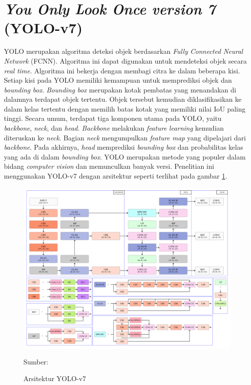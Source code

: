 \section{\textit{You Only Look Once version 7} (YOLO-v7)}
YOLO merupakan algoritma deteksi objek berdasarkan \textit{Fully Connected Neural Network} (FCNN). Algoritma ini dapat digunakan untuk mendeteksi objek secara \textit{real time}. Algoritma ini bekerja dengan membagi citra ke dalam beberapa kisi. Setiap kisi pada YOLO memiliki kemampuan untuk memprediksi objek dan \textit{bounding box}. \textit{Bounding box} merupakan kotak pembatas yang menandakan di dalamnya terdapat objek tertentu. Objek tersebut kemudian diklasifikasikan ke dalam kelas tertentu dengan memilih batas kotak yang memiliki nilai IoU paling tinggi. Secara umum, terdapat tiga komponen utama pada YOLO, yaitu \textit{backbone}, \textit{neck}, dan \textit{head}. \textit{Backbone} melakukan \textit{feature learning} kemudian diteruskan ke \textit{neck}. Bagian \textit{neck} mengumpulkan \textit{feature map} yang dipelajari dari \textit{backbone}. Pada akhirnya, \textit{head} memprediksi \textit{bounding box} dan probabilitas kelas yang ada di dalam \textit{bounding box}. YOLO merupakan metode yang populer dalam bidang \textit{computer vision} dan memunculkan banyak versi. Penelitian ini menggunakan YOLO-v7 dengan arsitektur seperti terlihat pada gambar \ref{fig:yolov7-archi}.
\begin{figure}[H]
    \begin{center}
        \includegraphics[width=13cm]{../img/YOLO-v7-Architecture.png}
        \caption{Arsitektur YOLO-v7}
        \label{fig:yolov7-archi}
        Sumber: \citep{Wang2022}
    \end{center}
\end{figure}

